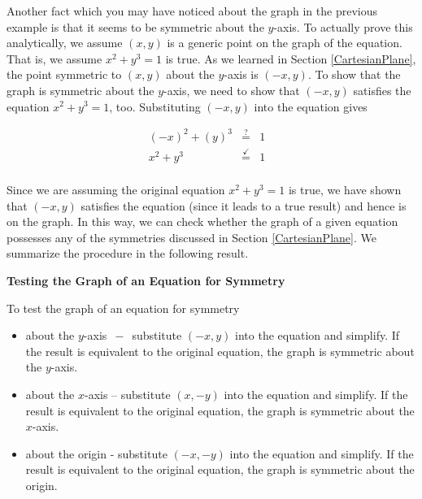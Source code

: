 \medskip

Another fact which you may have noticed about the graph in the previous example is that it seems to be symmetric about the $y$-axis.  To actually prove this analytically, we assume $(x,y)$ is a generic point on the graph of the equation. That is, we assume  $x^2 + y^3 = 1$ is true.  As we learned in Section \ref{CartesianPlane},  the point symmetric to $(x,y)$ about the $y$-axis is $(-x,y)$.  To show that the graph is symmetric about the $y$-axis, we need to show that $(-x,y)$ satisfies the equation $x^2 + y^3 = 1$, too.  Substituting $(-x,y)$ into the equation gives

\setlength{\extrarowheight}{2pt}

\[ \begin{array}{rclr}   
(-x)^2+(y)^3 & \stackrel{?}{=} & 1 & \\
   x^2 + y^3 & \stackrel{\checkmark}{=} & 1 & \\ 
   \end{array} \]

Since we are assuming the original equation $x^2 + y^3 = 1$ is true, we have shown that $(-x, y)$ satisfies the equation (since it leads to a true result) and hence is on the graph.  In this way, we can check whether the graph of a given equation possesses any of the symmetries discussed in Section \ref{CartesianPlane}.  We summarize the procedure in the following result.  

\medskip

\colorbox{ResultColor}{\bbm


\centerline{\textbf{Testing the Graph of an Equation for Symmetry}}
\label{symmetrytestequations}

\medskip

\hspace{.17in} To test the graph of an equation for symmetry  

\begin{itemize}

\item about the $y$-axis $\, - \,$ substitute $(-x,y)$ into the equation and simplify. If the result is equivalent to the original equation, the graph is symmetric about the $y$-axis.

\item about the $x$-axis -- substitute $(x,-y)$ into the equation and simplify. If the result is equivalent to the original equation, the graph is symmetric about the $x$-axis.

\item about the origin - substitute $(-x,-y)$ into the equation and simplify. If the result is equivalent to the original equation, the graph is symmetric about the origin.

\end{itemize}

\ebm}

